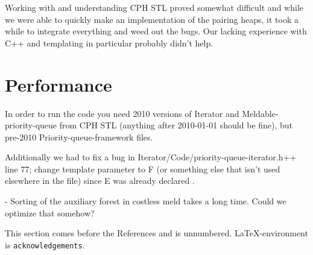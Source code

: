 \documentclass{DIKU-article}[2010/01/13]
\begin{document}
Working with and understanding CPH STL proved somewhat difficult and while we
were able to quickly make an implementation of the pairing heaps, it took a
while to integrate everything and weed out the bugs. Our lacking experience with
C++ and templating in particular probably didn't help.

\section{Performance}

In order to run the code you need 2010 versions of Iterator and
Meldable-priority-queue from CPH STL (anything after 2010-01-01 should be fine),
but pre-2010 Priority-queue-framework files.

Additionally we had to fix a bug in Iterator/Code/priority-queue-iterator.h++
line 77; change template parameter to F (or something else that isn't used
elsewhere in the file) since E was already declared .

- Sorting of the auxiliary forest in costless meld takes a long time. Could we
  optimize that somehow?

\begin{acknowledgements}
This section comes before the References and is unnumbered.
\LaTeX-en\-viron\-ment is \verb|acknowledgements|.
\end{acknowledgements}


\end{document}
